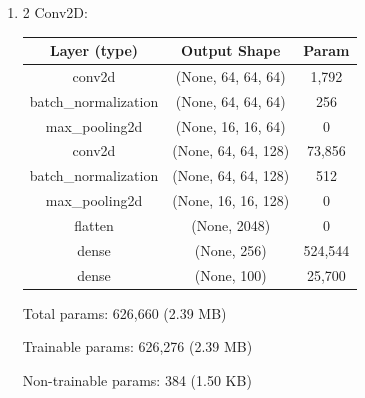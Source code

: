 \documentclass{article}
\begin{document}
\begin{enumerate}
        \newpage
            \item 2 Conv2D:
            \begin{table}[h!]
                \begin{tabular}{| c | c | c |}
                    \hline
                    Layer (type) & Output Shape & Param \\
                    \hline
                    conv2d & (None, 64, 64, 64) & 1,792 \\
                    \hline
                    batch\_normalization & (None, 64, 64, 64) & 256 \\
                    \hline
                    max\_pooling2d & (None, 16, 16, 64) & 0 \\
                    \hline
                    conv2d & (None, 64, 64, 128) & 73,856 \\
                    \hline
                    batch\_normalization & (None, 64, 64, 128) & 512 \\
                    \hline
                    max\_pooling2d & (None, 16, 16, 128) & 0 \\
                    \hline
                    flatten & (None, 2048) & 0 \\
                    \hline
                    dense & (None, 256) & 524,544 \\
                    \hline
                    dense & (None, 100) &  25,700 \\
                    \hline
                \end{tabular}
            \end{table}

            Total params: 626,660 (2.39 MB)

            Trainable params: 626,276 (2.39 MB)
            
            Non-trainable params: 384 (1.50 KB)
        

\end{enumerate}
\end{document}
